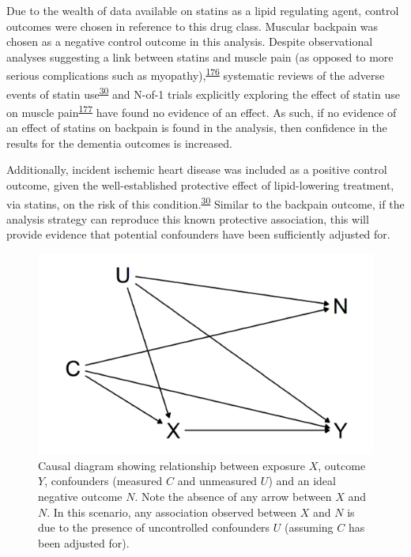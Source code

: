\documentclass[a4paper, twoside]{templates/ociamthesis}
\begin{document}
Due to the wealth of data available on statins as a lipid regulating agent, control outcomes were chosen in reference to this drug class. Muscular backpain was chosen as a negative control outcome in this analysis. Despite observational analyses suggesting a link between statins and muscle pain (as opposed to more serious complications such as myopathy),\textsuperscript{\protect\hyperlink{ref-selva-ocallaghan2018}{176}} systematic reviews of the adverse events of statin use\textsuperscript{\protect\hyperlink{ref-collins2016a}{30}} and N-of-1 trials explicitly exploring the effect of statin use on muscle pain\textsuperscript{\protect\hyperlink{ref-herrett2021}{177}} have found no evidence of an effect. As such, if no evidence of an effect of statins on backpain is found in the analysis, then confidence in the results for the dementia outcomes is increased.

Additionally, incident ischemic heart disease was included as a positive control outcome, given the well-established protective effect of lipid-lowering treatment, via statins, on the risk of this condition.\textsuperscript{\protect\hyperlink{ref-collins2016a}{30}} Similar to the backpain outcome, if the analysis strategy can reproduce this known protective association, this will provide evidence that potential confounders have been sufficiently adjusted for.





\begin{figure}[H]
\includegraphics[width=1\linewidth]{figures/cprd-analysis/negativeOutcome} \caption[DAG of ideal negative outcome]{Causal diagram showing relationship between exposure \(X\), outcome \(Y\), confounders (measured \(C\) and unmeasured \(U\)) and an ideal negative outcome \(N\). Note the absence of any arrow between \(X\) and \(N\). In this scenario, any association observed between \(X\) and \(N\) is due to the presence of uncontrolled confounders \(U\) (assuming \(C\) has been adjusted for).}\label{fig:negativeOutcome}
\end{figure}
\end{document}
